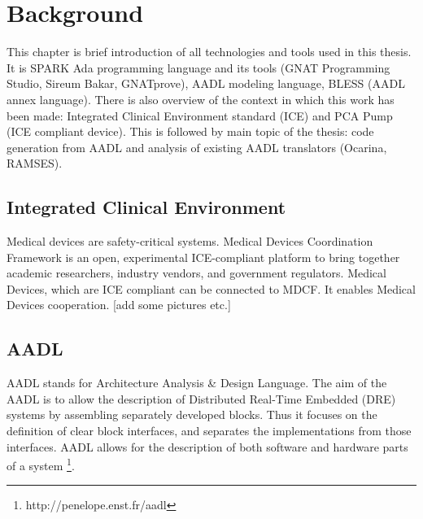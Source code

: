 
\cleardoublepage


\chapter{Background}
\label{background}

This chapter is brief introduction of all technologies and tools used in this thesis. It is SPARK Ada programming language and its tools (GNAT Programming Studio, Sireum Bakar, GNATprove), AADL modeling language, BLESS (AADL annex language). There is also overview of the context in which this work has been made: Integrated Clinical Environment standard (ICE) and PCA Pump (ICE compliant device). This is followed by main topic of the thesis: code generation from AADL and analysis of existing AADL translators (Ocarina, RAMSES).



\section{Integrated Clinical Environment}
\label{background:ice}
Medical devices are safety-critical systems.
Medical Devices Coordination Framework is an open, experimental ICE-compliant platform to bring together academic researchers, industry vendors, and government regulators.
Medical Devices, which are ICE compliant can be connected to MDCF. It enables Medical Devices cooperation.
[add some pictures etc.]


\section{AADL}
\label{background:aadl}

AADL stands for Architecture Analysis \& Design Language. The aim of the AADL is to allow the description of Distributed Real-Time Embedded (DRE) systems by assembling separately developed blocks. Thus it focuses on the definition of clear block interfaces, and separates the implementations from those interfaces. AADL allows for the description of both software and hardware parts of a system \footnote{http://penelope.enst.fr/aadl}. 

